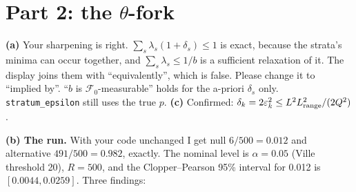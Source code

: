 \documentclass[11pt]{article}
\begin{document}
\section*{Part 2: the $\theta$-fork}
\textbf{(a)} Your sharpening is right. $\sum_s\lambda_s(1+\delta_s)\le1$ is exact, because the strata's minima can occur together, and $\sum_s\lambda_s\le1/b$ is a sufficient relaxation of it. The display joins them with ``equivalently'', which is false. Please change it to ``implied by''. ``$b$ is $\mathcal F_0$-measurable'' holds for the a-priori $\delta_s$ only. \texttt{stratum\_epsilon} still uses the true $p$.
\textbf{(c)} Confirmed: $\delta_k=2\varepsilon_k^2\le L^2L_{\rm range}^2/(2Q^2)$.

\textbf{(b) The run.} With your code unchanged I get null $6/500=0.012$ and alternative $491/500=0.982$, exactly. The nominal level is $\alpha=0.05$ (Ville threshold 20), $R=500$, and the Clopper--Pearson 95\% interval for 0.012 is $[0.0044,0.0259]$. Three findings:
\end{document}
